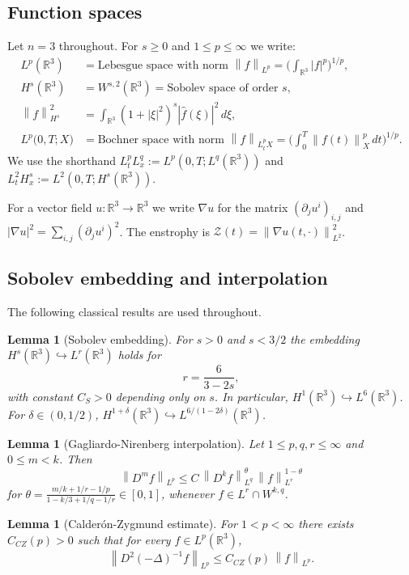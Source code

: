 \documentclass[12pt]{article}
\theoremstyle{plain}
\newtheorem{lemma}[theorem]{Lemma}
\theoremstyle{definition}
\theoremstyle{remark}
\newcommand{\R}{\mathbb{R}}
\newcommand{\Ws}[2]{W^{#1,#2}}
\newcommand{\norm}[1]{\left\|#1\right\|}
\newcommand{\abs}[1]{\left|#1\right|}
\newcommand{\pa}{\partial}
\newcommand{\grad}{\nabla}
\newcommand{\lap}{\Delta}
\begin{document}
\subsection{Function spaces}

Let $n=3$ throughout.
For $s\geq 0$ and $1\leq p\leq\infty$ we write:
\begin{align*}
  L^p(\R^3) &= \text{Lebesgue space with norm }
    \norm{f}_{L^p}=\bigl(\int_{\R^3}\abs{f}^p\bigr)^{1/p},\\
  H^s(\R^3) &= W^{s,2}(\R^3) = \text{Sobolev space of order }s,\\
  \norm{f}_{H^s}^2 &= \int_{\R^3}(1+\abs{\xi}^2)^s\abs{\hat f(\xi)}^2\,d\xi,\\
  L^p\bigl(0,T;X\bigr) &= \text{Bochner space with norm }
    \norm{f}_{L^p_t X}=\bigl(\int_0^T\norm{f(t)}_X^p\,dt\bigr)^{1/p}.
\end{align*}
We use the shorthand $L^p_t L^q_x := L^p(0,T;L^q(\R^3))$ and
$L^2_t H^s_x := L^2(0,T;H^s(\R^3))$.

For a vector field $u:\R^3\to\R^3$ we write $\grad u$ for the matrix
$(\pa_j u^i)_{i,j}$ and $\abs{\grad u}^2 = \sum_{i,j}(\pa_j u^i)^2$.
The enstrophy is $\mathcal{Z}(t)=\norm{\grad u(t,\cdot)}_{L^2}^2$.

\subsection{Sobolev embedding and interpolation}

The following classical results are used throughout.

\begin{lemma}[Sobolev embedding]\label{lem:sobolev-embedding}
  For $s>0$ and $s<3/2$ the embedding $H^s(\R^3)\hookrightarrow L^r(\R^3)$ holds for
  \[
    r = \frac{6}{3-2s},
  \]
  with constant $C_S>0$ depending only on $s$.
  In particular, $H^1(\R^3)\hookrightarrow L^6(\R^3)$.
  For $\delta\in(0,1/2)$, $H^{1+\delta}(\R^3)\hookrightarrow L^{6/(1-2\delta)}(\R^3)$.
\end{lemma}

\begin{lemma}[Gagliardo-Nirenberg interpolation]\label{lem:GN}
  Let $1\leq p,q,r\leq\infty$ and $0\leq m<k$.
  Then
  \[
    \norm{D^m f}_{L^p} \leq C\,\norm{D^k f}_{L^q}^\theta\,\norm{f}_{L^r}^{1-\theta}
  \]
  for $\theta=\frac{m/k+1/r-1/p}{1-k/3+1/q-1/r}\in[0,1]$,
  whenever $f\in L^r\cap\Ws{k}{q}$.
\end{lemma}

\begin{lemma}[Calderón-Zygmund estimate]\label{lem:CZ}
  For $1<p<\infty$ there exists $C_{CZ}(p)>0$ such that for every
  $f\in L^p(\R^3)$,
  \[
    \norm{D^2(-\lap)^{-1}f}_{L^p} \leq C_{CZ}(p)\,\norm{f}_{L^p}.
  \]
\end{lemma}
\end{document}
